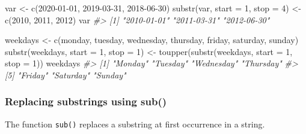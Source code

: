 \documentclass[
]{book}
\newenvironment{Shaded}{\begin{snugshade}}{\end{snugshade}}
\newcommand{\AttributeTok}[1]{\textcolor[rgb]{0.77,0.63,0.00}{#1}}
\newcommand{\CommentTok}[1]{\textcolor[rgb]{0.56,0.35,0.01}{\textit{#1}}}
\newcommand{\DecValTok}[1]{\textcolor[rgb]{0.00,0.00,0.81}{#1}}
\newcommand{\FunctionTok}[1]{\textcolor[rgb]{0.00,0.00,0.00}{#1}}
\newcommand{\NormalTok}[1]{#1}
\newcommand{\OtherTok}[1]{\textcolor[rgb]{0.56,0.35,0.01}{#1}}
\newcommand{\StringTok}[1]{\textcolor[rgb]{0.31,0.60,0.02}{#1}}
\begin{document}
\begin{Shaded}
\begin{Highlighting}[]
\NormalTok{var }\OtherTok{\textless{}{-}} \FunctionTok{c}\NormalTok{(}\StringTok{\textquotesingle{}2020{-}01{-}01\textquotesingle{}}\NormalTok{, }\StringTok{\textquotesingle{}2019{-}03{-}31\textquotesingle{}}\NormalTok{, }\StringTok{\textquotesingle{}2018{-}06{-}30\textquotesingle{}}\NormalTok{)}
\FunctionTok{substr}\NormalTok{(var, }\AttributeTok{start =} \DecValTok{1}\NormalTok{, }\AttributeTok{stop =} \DecValTok{4}\NormalTok{) }\OtherTok{\textless{}{-}} \FunctionTok{c}\NormalTok{(}\StringTok{\textquotesingle{}2010\textquotesingle{}}\NormalTok{, }\StringTok{\textquotesingle{}2011\textquotesingle{}}\NormalTok{, }\StringTok{\textquotesingle{}2012\textquotesingle{}}\NormalTok{)}
\NormalTok{var}
\CommentTok{\#\textgreater{} [1] "2010{-}01{-}01" "2011{-}03{-}31" "2012{-}06{-}30"}

\NormalTok{weekdays }\OtherTok{\textless{}{-}} \FunctionTok{c}\NormalTok{(}\StringTok{\textquotesingle{}monday\textquotesingle{}}\NormalTok{, }\StringTok{\textquotesingle{}tuesday\textquotesingle{}}\NormalTok{, }\StringTok{\textquotesingle{}wednesday\textquotesingle{}}\NormalTok{, }\StringTok{\textquotesingle{}thursday\textquotesingle{}}\NormalTok{, }\StringTok{\textquotesingle{}friday\textquotesingle{}}\NormalTok{, }\StringTok{\textquotesingle{}saturday\textquotesingle{}}\NormalTok{, }\StringTok{\textquotesingle{}sunday\textquotesingle{}}\NormalTok{)}
\FunctionTok{substr}\NormalTok{(weekdays, }\AttributeTok{start =} \DecValTok{1}\NormalTok{, }\AttributeTok{stop =} \DecValTok{1}\NormalTok{) }\OtherTok{\textless{}{-}} \FunctionTok{toupper}\NormalTok{(}\FunctionTok{substr}\NormalTok{(weekdays, }\AttributeTok{start =} \DecValTok{1}\NormalTok{, }\AttributeTok{stop =} \DecValTok{1}\NormalTok{))}
\NormalTok{weekdays}
\CommentTok{\#\textgreater{} [1] "Monday"    "Tuesday"   "Wednesday" "Thursday" }
\CommentTok{\#\textgreater{} [5] "Friday"    "Saturday"  "Sunday"}
\end{Highlighting}
\end{Shaded}

\hypertarget{replacing-substrings-using-sub}{%
\subsubsection{Replacing substrings using sub()}\label{replacing-substrings-using-sub}}

The function \texttt{sub()} replaces a substring at first occurrence in a string.
\end{document}
